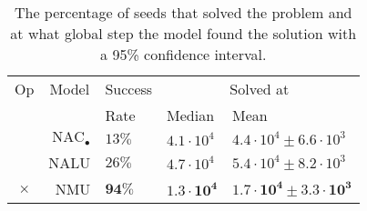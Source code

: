 \begin{table}[!h]

\caption{\label{tab:very-simple-function-results}The percentage of seeds that solved the problem and at what global step the model found the solution with a 95\% confidence interval.}
\centering
\begin{tabular}{crlll}
\toprule
\multicolumn{1}{c}{Op} & \multicolumn{1}{c}{Model} & \multicolumn{1}{c}{Success} & \multicolumn{2}{c}{Solved at} \\
\cmidrule(l{3pt}r{3pt}){1-1} \cmidrule(l{3pt}r{3pt}){2-2} \cmidrule(l{3pt}r{3pt}){3-3} \cmidrule(l{3pt}r{3pt}){4-5}
 &  & Rate & Median & Mean\\
\midrule
 & ${\mathrm{NAC}_\bullet}$ & $13\%$ & $4.1 \cdot 10^{4}$ & $4.4 \cdot 10^{4} \pm 6.6 \cdot 10^{3}$\\

 & NALU & $26\%$ & $4.7 \cdot 10^{4}$ & $5.4 \cdot 10^{4} \pm 8.2 \cdot 10^{3}$\\

\multirow{-3}{*}{\centering\arraybackslash $\bm{\times}$} & NMU & $\mathbf{94\%}$ & $\mathbf{1.3 \cdot 10^{4}}$ & $\mathbf{1.7 \cdot 10^{4} \pm 3.3 \cdot 10^{3}}$\\
\bottomrule
\end{tabular}
\end{table}
